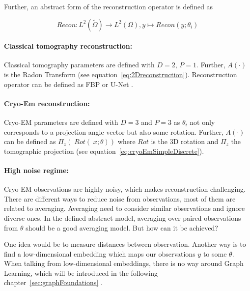 Further, an abstract form of the reconstruction operator is defined as 

\begin{equation}
    Recon : L^2(\tilde{\Omega}) \to L^2(\Omega), y \mapsto Recon(y; \theta_i)
\end{equation}



\paragraph{Classical tomography reconstruction:}

Classical tomography parameters are defined with $D=2$, $P=1$.
Further, $A(\cdot)$ is the Radon Transform (see equation~\ref{eq:2Dreconstruction}).
Reconstruction operator can be defined as FBP or U-Net \cite{unet-tomography}.

\paragraph{Cryo-Em reconstruction:}
Cryo-EM parameters are defined with $D=3$ and $P=3$ as $\theta_i$ not only corresponds to
a projection angle vector but also some rotation.
Further, $A(\cdot)$ can be defined as $\Pi_z \left(\; Rot(\;x; \theta) \right)$ 
where $Rot$ is the 3D rotation and $\Pi_z$ the tomographic projection (see equation~\ref{eq:cryoEmSimpleDiscrete}).

\paragraph{High noise regime:}
Cryo-EM observations are highly noisy, which makes reconstruction challenging. 
There are different ways to reduce noise from observations, most of them are related to averaging. 
Averaging need to consider similar observations and ignore diverse ones. 
In the defined abstract model, averaging over paired observations from $\theta$ should be a good averaging model.
But how can it be achieved? 

One idea would be to measure distances between observation.
Another way is to find a low-dimensional embedding which maps our observations $y$ to some $\theta$.
When talking from low-dimensional embeddings, there is no way around Graph Learning, which will be introduced
in the following chapter~\ref{sec:graphFoundations} \textit{}.

